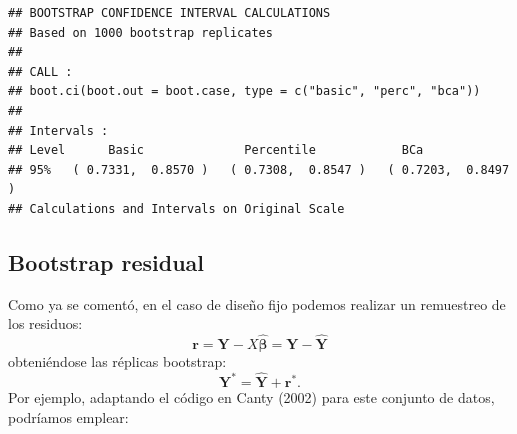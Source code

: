\documentclass[
]{book}
\newenvironment{Shaded}{\begin{snugshade}}{\end{snugshade}}
\newcommand{\AttributeTok}[1]{\textcolor[rgb]{0.13,0.29,0.53}{#1}}
\newcommand{\ControlFlowTok}[1]{\textcolor[rgb]{0.13,0.29,0.53}{\textbf{#1}}}
\newcommand{\DecValTok}[1]{\textcolor[rgb]{0.00,0.00,0.81}{#1}}
\newcommand{\FunctionTok}[1]{\textcolor[rgb]{0.13,0.29,0.53}{\textbf{#1}}}
\newcommand{\NormalTok}[1]{#1}
\newcommand{\OtherTok}[1]{\textcolor[rgb]{0.56,0.35,0.01}{#1}}
\newcommand{\SpecialCharTok}[1]{\textcolor[rgb]{0.81,0.36,0.00}{\textbf{#1}}}
\renewcommand{\boldsymbol}[1]{\symbf{#1}}
\renewcommand{\mathbf}[1]{\symbf{#1}}
\theoremstyle{break}
\theoremstyle{nonumberplain}
\begin{document}
\begin{verbatim}
## BOOTSTRAP CONFIDENCE INTERVAL CALCULATIONS
## Based on 1000 bootstrap replicates
## 
## CALL : 
## boot.ci(boot.out = boot.case, type = c("basic", "perc", "bca"))
## 
## Intervals : 
## Level      Basic              Percentile            BCa          
## 95%   ( 0.7331,  0.8570 )   ( 0.7308,  0.8547 )   ( 0.7203,  0.8497 )  
## Calculations and Intervals on Original Scale
\end{verbatim}

\subsection{Bootstrap residual}\label{boot-residual}

Como ya se comentó, en el caso de diseño fijo podemos realizar un remuestreo de los residuos:
\[\mathbf{r} = \mathbf{Y} - X\hat{\boldsymbol{\beta}} = \mathbf{Y} - \hat{\mathbf{Y}}\]
obteniéndose las réplicas bootstrap:
\[\mathbf{Y}^{\ast} = \hat{\mathbf{Y}} + \mathbf{r}^{\ast}.\]
Por ejemplo, adaptando el código en Canty (2002) para este conjunto de datos, podríamos emplear:

\begin{Shaded}
\end{Shaded}
\end{document}
